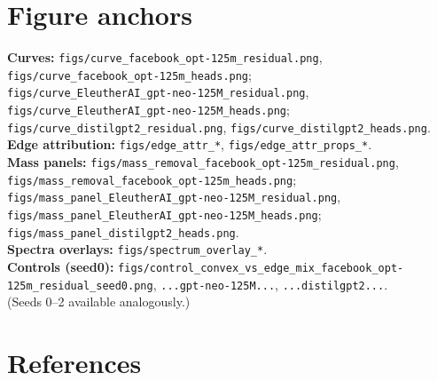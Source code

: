 \documentclass[11pt]{article}
\newcommand{\1}{\mathbf{1}}
\begin{document}
\section{Figure anchors}\label{app:figs}
\textbf{Curves:} \texttt{figs/curve\_facebook\_opt-125m\_residual.png}, \texttt{figs/curve\_facebook\_opt-125m\_heads.png};\\
\texttt{figs/curve\_EleutherAI\_gpt-neo-125M\_residual.png}, \texttt{figs/curve\_EleutherAI\_gpt-neo-125M\_heads.png};\\
\texttt{figs/curve\_distilgpt2\_residual.png}, \texttt{figs/curve\_distilgpt2\_heads.png}.\\[0.25em]
\textbf{Edge attribution:} \texttt{figs/edge\_attr\_*}, \texttt{figs/edge\_attr\_props\_*}.\\[0.25em]
\textbf{Mass panels:} \texttt{figs/mass\_removal\_facebook\_opt-125m\_residual.png}, \texttt{figs/mass\_removal\_facebook\_opt-125m\_heads.png}; \texttt{figs/mass\_panel\_EleutherAI\_gpt-neo-125M\_residual.png}, \texttt{figs/mass\_panel\_EleutherAI\_gpt-neo-125M\_heads.png}; \texttt{figs/mass\_panel\_distilgpt2\_heads.png}.\\[0.25em]
\textbf{Spectra overlays:} \texttt{figs/spectrum\_overlay\_*}.\\[0.25em]
\textbf{Controls (seed0):} \texttt{figs/control\_convex\_vs\_edge\_mix\_facebook\_opt-125m\_residual\_seed0.png}, \texttt{...gpt-neo-125M...}, \texttt{...distilgpt2...}.\\
(Seeds 0--2 available analogously.)

\section{References}
\vspace{-0.25em}
\end{document}

